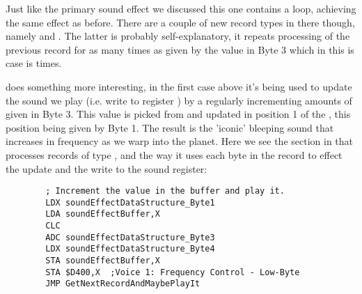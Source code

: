 Just like the primary sound effect we discussed this one contains a loop, achieving the same effect as before. 
There are a couple of new record types in there though, namely  and .
The latter is probably self-explanatory, it repeats processing of the previous record for as many times as given by the 
value in Byte 3 which in this is case is  times.

 does something more interesting, in the first case above it's being used to update the sound we play
(i.e. write to register ) by a regularly incrementing amounts of  given in Byte 3. This value is picked
from and updated in position 1 of the , this position being given by Byte 1. The result is the 'iconic'
bleeping sound that increases in frequency as we warp into the planet. Here we see the section in  that
processes records of type , and the way it uses each byte in the record to effect the update
and the write to the sound register:

\begin{lstlisting}
        ; Increment the value in the buffer and play it.
        LDX soundEffectDataStructure_Byte1
        LDA soundEffectBuffer,X
        CLC
        ADC soundEffectDataStructure_Byte3
        LDX soundEffectDataStructure_Byte4
        STA soundEffectBuffer,X
        STA $D400,X  ;Voice 1: Frequency Control - Low-Byte
        JMP GetNextRecordAndMaybePlayIt
\end{lstlisting}


